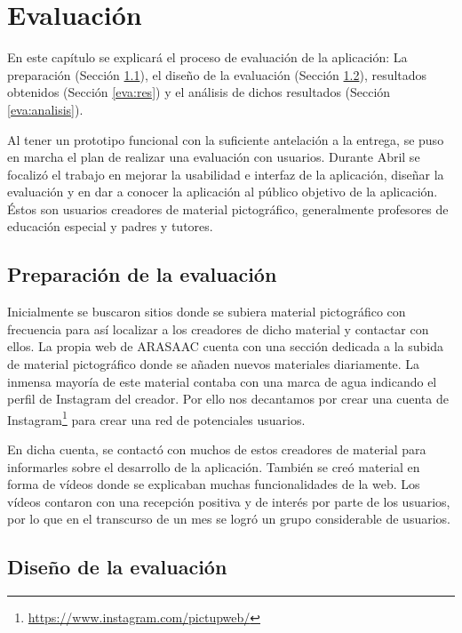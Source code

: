 \chapter{Evaluación}
\label{cap:evaluacion}



\begin{resumen}
En este capítulo se explicará el proceso de evaluación de la aplicación: La preparación (Sección \ref{eva:prep}), el diseño de la evaluación (Sección \ref{eva:dis}), resultados obtenidos (Sección \ref{eva:res}) y el análisis de dichos resultados (Sección \ref{eva:analisis}).  
	
\end{resumen}

Al tener un prototipo funcional con la suficiente antelación a la entrega, se puso en marcha el plan de realizar una evaluación con usuarios. Durante Abril se focalizó el trabajo en mejorar la usabilidad e interfaz de la aplicación, diseñar la evaluación y en dar a conocer la aplicación al público objetivo de la aplicación. Éstos son usuarios creadores de material pictográfico, generalmente profesores de educación especial y padres y tutores. 


\section{Preparación de la evaluación}
\label{eva:prep}


Inicialmente se buscaron sitios donde se subiera material pictográfico con frecuencia para así localizar a los creadores de dicho material y contactar con ellos. La propia web de ARASAAC cuenta con una sección dedicada a la subida de material pictográfico donde se añaden nuevos materiales diariamente. La inmensa mayoría de este material contaba con una marca de agua indicando el perfil de Instagram del creador. Por ello nos decantamos por crear una cuenta de Instagram\footnote{\url{https://www.instagram.com/pictupweb/}} para crear una red de potenciales usuarios. 

En dicha cuenta, se contactó con muchos de estos creadores de material para informarles sobre el desarrollo de la aplicación. También se creó material en forma de vídeos donde se explicaban muchas funcionalidades de la web. Los vídeos contaron con una recepción positiva y de interés por parte de los usuarios, por lo que en el transcurso de un mes se logró un grupo considerable de usuarios.
\section{Diseño de la evaluación}
\label{eva:dis}

